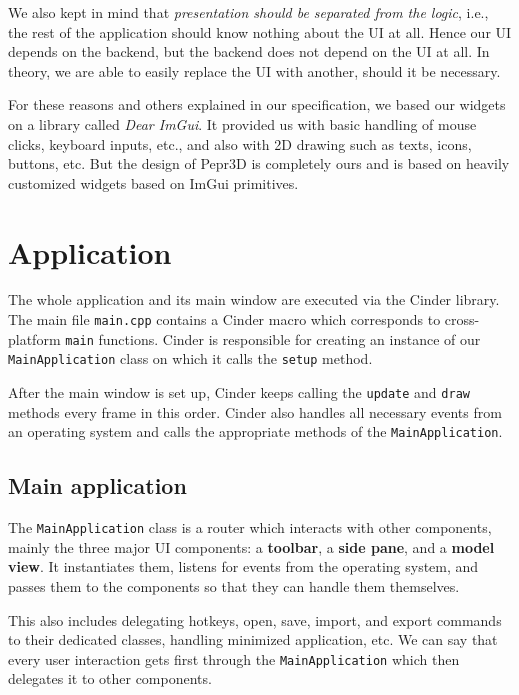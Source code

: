 We also kept in mind that \emph{presentation should be separated from the logic}, i.e., the rest of the application should know nothing about the UI at all.
Hence our UI depends on the backend, but the backend does not depend on the UI at all.
In theory, we are able to easily replace the UI with another, should it be necessary.

For these reasons and others explained in our specification, we based our widgets on a library called \emph{Dear ImGui}.
It provided us with basic handling of mouse clicks, keyboard inputs, etc., and also with 2D drawing such as texts, icons, buttons, etc.
But the design of Pepr3D is completely ours and is based on heavily customized widgets based on ImGui primitives.

\section{Application}

\label{sec:app}

The whole application and its main window are executed via the Cinder library.
The main file \texttt{main.cpp} contains a Cinder macro which corresponds to cross-platform \texttt{main} functions.
Cinder is responsible for creating an instance of our \texttt{MainApplication} class on which it calls the \texttt{setup} method.

After the main window is set up, Cinder keeps calling the \texttt{update} and \texttt{draw} methods every frame in this order.
Cinder also handles all necessary events from an operating system and calls the appropriate methods of the \texttt{MainApplication}.

\subsection{Main application}

The \texttt{MainApplication} class is a router which interacts with other components, mainly the three major UI components: a \textbf{toolbar}, a \textbf{side pane}, and a \textbf{model view}.
It instantiates them, listens for events from the operating system, and passes them to the components so that they can handle them themselves.

This also includes delegating hotkeys, open, save, import, and export commands to their dedicated classes, handling minimized application, etc.
We can say that every user interaction gets first through the \texttt{MainApplication} which then delegates it to other components.

